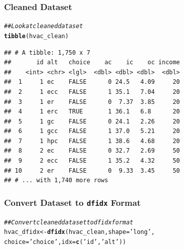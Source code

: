 \documentclass{beamer}\usepackage[]{graphicx}\usepackage[]{xcolor}
\makeatletter
\newcommand{\hlstr}[1]{\textcolor[rgb]{0.192,0.494,0.8}{#1}}%
\newcommand{\hlcom}[1]{\textcolor[rgb]{0.678,0.584,0.686}{\textit{#1}}}%
\newcommand{\hlstd}[1]{\textcolor[rgb]{0.345,0.345,0.345}{#1}}%
\newcommand{\hlkwb}[1]{\textcolor[rgb]{0.69,0.353,0.396}{#1}}%
\newcommand{\hlkwc}[1]{\textcolor[rgb]{0.333,0.667,0.333}{#1}}%
\newcommand{\hlkwd}[1]{\textcolor[rgb]{0.737,0.353,0.396}{\textbf{#1}}}%
\newenvironment{kframe}{%
 \def\at@end@of@kframe{}%
 \ifinner\ifhmode%
  \def\at@end@of@kframe{\end{minipage}}%
  \begin{minipage}{\columnwidth}%
 \fi\fi%
 \def\FrameCommand##1{\hskip\@totalleftmargin \hskip-\fboxsep
 \colorbox{shadecolor}{##1}\hskip-\fboxsep
     \hskip-\linewidth \hskip-\@totalleftmargin \hskip\columnwidth}%
 \MakeFramed {\advance\hsize-\width
   \@totalleftmargin\z@ \linewidth\hsize
   \@setminipage}}%
 {\par\unskip\endMakeFramed%
 \at@end@of@kframe}
\newenvironment{knitrout}{}{} %
\makeatother
\begin{document}
\begin{frame}[fragile]\frametitle{Cleaned Dataset}
\begin{knitrout}\footnotesize
{}\color{fgcolor}\begin{kframe}
\begin{alltt}
\hlcom{## Look at cleaned dataset}
\hlkwd{tibble}\hlstd{(hvac_clean)}
\end{alltt}
\begin{verbatim}
## # A tibble: 1,750 x 7
##       id alt   choice    ac    ic    oc income
##    <int> <chr> <lgl>  <dbl> <dbl> <dbl>  <dbl>
##  1     1 ec    FALSE      0 24.5   4.09     20
##  2     1 ecc   FALSE      1 35.1   7.04     20
##  3     1 er    FALSE      0  7.37  3.85     20
##  4     1 erc   TRUE       1 36.1   6.8      20
##  5     1 gc    FALSE      0 24.1   2.26     20
##  6     1 gcc   FALSE      1 37.0   5.21     20
##  7     1 hpc   FALSE      1 38.6   4.68     20
##  8     2 ec    FALSE      0 32.7   2.69     50
##  9     2 ecc   FALSE      1 35.2   4.32     50
## 10     2 er    FALSE      0  9.33  3.45     50
## # ... with 1,740 more rows
\end{verbatim}
\end{kframe}
\end{knitrout}
\end{frame}

\begin{frame}[fragile]\frametitle{Convert Dataset to \texttt{dfidx} Format}
\begin{knitrout}\footnotesize
{}\color{fgcolor}\begin{kframe}
\begin{alltt}
\hlcom{## Convert cleaned dataset to dfidx format}
\hlstd{hvac_dfidx} \hlkwb{<-} \hlkwd{dfidx}\hlstd{(hvac_clean,} \hlkwc{shape} \hlstd{=} \hlstr{'long'}\hlstd{,}
                    \hlkwc{choice} \hlstd{=} \hlstr{'choice'}\hlstd{,} \hlkwc{idx} \hlstd{=} \hlkwd{c}\hlstd{(}\hlstr{'id'}\hlstd{,} \hlstr{'alt'}\hlstd{))}
\end{alltt}
\end{kframe}
\end{knitrout}
\end{frame}
\end{document}
